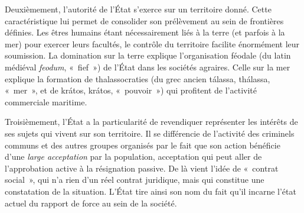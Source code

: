 %

Deuxièmement, l'autorité de l'État s'exerce sur un territoire donné. Cette caractéristique lui permet de consolider son prélèvement au sein de frontières définies. Les êtres humains étant nécessairement liés à la terre (et parfois à la mer) pour exercer leurs facultés, le contrôle du territoire facilite énormément leur soumission. La domination sur la terre explique l'organisation féodale (du latin médiéval \emph{feodum}, «~fief~») de l'État dans les sociétés agraires. Celle sur la mer explique la formation de thalassocraties (du grec ancien \foreignlanguage{greek}{tálassa}, thálassa, «~mer~», et de \foreignlanguage{greek}{krátos}, krátos, «~pouvoir~») qui profitent de l'activité commerciale maritime.

Troisièmement, l'État a la particularité de revendiquer représenter les intérêts de ses sujets qui vivent sur son territoire. Il se différencie de l'activité des criminels communs et des autres groupes organisés par le fait que son action bénéficie d'une \emph{large acceptation} par la population, acceptation qui peut aller de l'approbation active à la résignation passive. De là vient l'idée de «~contrat social~», qui n'a rien d'un réel contrat juridique, mais qui constitue une constatation de la situation. L'État tire ainsi son nom du fait qu'il incarne l'état actuel du rapport de force au sein de la société.

